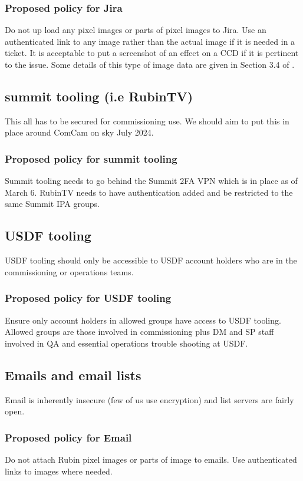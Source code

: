\subsubsection{Proposed policy for Jira}
Do not up load any pixel images or parts of pixel images to Jira.
Use an authenticated link to any image rather than the actual image if it is needed in a ticket.
It is acceptable to put a screenshot of an effect on a CCD if it is pertinent to the issue.
Some details of this type of image data are given in Section 3.4 of .

\subsection{summit tooling (i.e RubinTV)}
This all has to be secured for commissioning use.
We should aim to put this in place around ComCam on sky July 2024.

\subsubsection{Proposed policy for summit tooling}
Summit tooling needs to go behind the Summit 2FA VPN which is in place as of March 6.
RubinTV needs to have authentication added and be restricted to the same Summit IPA groups.

\subsection{USDF tooling}
USDF tooling should only be accessible to USDF account holders who are in the commissioning or operations teams.
\subsubsection{Proposed policy for USDF tooling}
Ensure only account holders in allowed groups have access to USDF tooling.
Allowed groups are those involved in commissioning plus DM and SP staff involved in QA and essential operations trouble shooting at USDF.

\subsection{Emails and email  lists }
Email is inherently insecure (few of us use encryption) and list servers are fairly open.

\subsubsection{Proposed policy for Email}
Do not attach Rubin pixel images or parts of image to emails.
Use authenticated links to images where needed.



